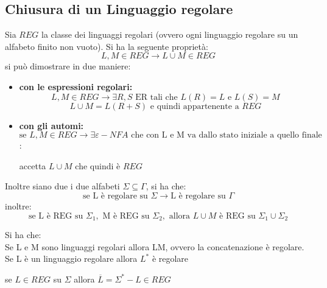 \documentclass[a4paper,12pt, oneside]{book}
\begin{document}
\subsection{Chiusura di un Linguaggio regolare}
Sia $REG$ la classe dei linguaggi regolari (ovvero ogni linguaggio regolare su un alfabeto finito non vuoto). Si ha la seguente proprietà:
$$L,M\in REG\to L\cup M\in REG$$
si può dimostrare in due maniere:
\begin{itemize}
\item \textbf{con le espressioni regolari:}
$$L,M\in REG \to \exists R, S \mbox{ ER tali che } L(R)=L \mbox { e } L(S)=M$$
$$L\cup M=L(R+S) \mbox{ e quindi appartenente a } REG$$
\item \textbf{con gli automi:}
$$\mbox{se }L,M\in REG\to \exists \varepsilon-NFA \mbox{ che con L e M va dallo stato iniziale a quello finale}$$:
\begin{center}
\end{center}
accetta $L\cup M$ che quindi è $REG$
\end{itemize}
Inoltre siano due i due alfabeti $\Sigma\subseteq\Gamma$, si ha che:
$$\mbox{se L è regolare su }\Sigma\to \mbox{L è regolare su }\Gamma$$
inoltre:
$$\mbox{se L è REG su }\Sigma_1, \mbox{ M è REG su }\Sigma_2, \mbox{ allora } L\cup M \mbox{ è REG su }\Sigma_1\cup\Sigma_2$$
\begin{teorema}
Si ha che:\\
Se L e M sono linguaggi regolari allora LM, ovvero la concatenazione è regolare.\\
Se L è un linguaggio regolare allora $L^*$ è regolare
\end{teorema}
\begin{teorema}
se $L\in REG$ su $\Sigma$ allora $\overline{L}=\Sigma^*-L\in REG$
\end{teorema}
\end{document}
